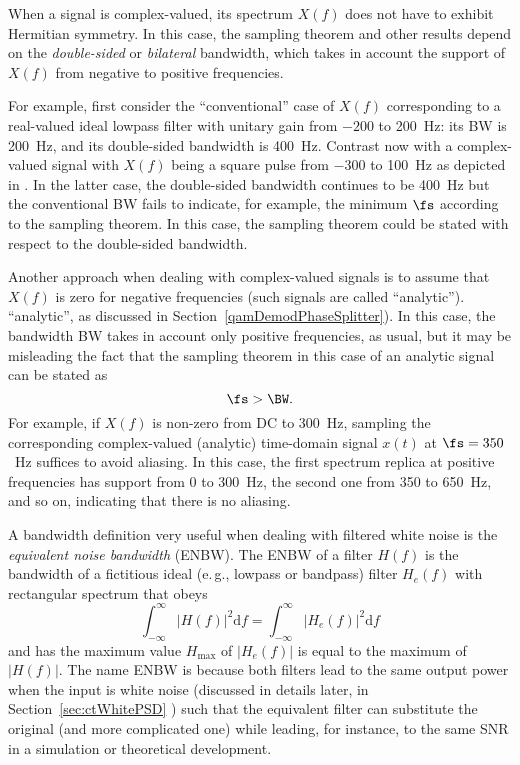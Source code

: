 When a signal is complex-valued, its spectrum $X(f)$ does not have to exhibit Hermitian symmetry.
In this case, the sampling theorem and other results depend on the \emph{double-sided} or \emph{bilateral} bandwidth, which takes in account the support of $X(f)$ from negative to positive frequencies. 

For example, first consider the ``conventional'' case of $X(f)$ corresponding to a real-valued ideal lowpass filter with unitary gain from $-200$ to 200~Hz: its BW is 200~Hz, and its double-sided bandwidth is 400~Hz. Contrast now with a complex-valued signal with $X(f)$ being a square pulse from $-300$ to 100~Hz as depicted in . In the latter case, the double-sided bandwidth continues to be 400~Hz but the conventional BW fails to indicate, for example, the minimum $\fs$ according to the sampling theorem. In this case, the sampling theorem could be stated with
respect to the double-sided bandwidth.

Another approach when dealing  with complex-valued signals is to assume that $X(f)$ is zero for negative frequencies (such
signals are called
\ifml
``analytic'').
\else
``analytic'', as discussed in Section~\ref{qamDemodPhaseSplitter}). 
\fi
In this case, the bandwidth BW takes in account only positive
frequencies, as usual, but it may be misleading the fact that the sampling theorem 
in this case of an analytic signal can be stated as
\begin{equation}
\fs > \BW.
\label{eq:samplingTheoremComplexSignals}
\end{equation}
For example, if $X(f)$ is non-zero from DC to 300~Hz, sampling the corresponding complex-valued
(analytic) time-domain signal $x(t)$ at $\fs = 350$~Hz suffices to avoid aliasing. In this case,
the first spectrum replica at positive frequencies has support from 0 to 300~Hz, the second one
from 350 to 650~Hz, and so on, indicating that there is no aliasing.

A bandwidth definition very useful when dealing with filtered white noise is the \emph{equivalent noise bandwidth} (ENBW). The ENBW of a filter $H(f)$ is the bandwidth of a fictitious ideal (e.\,g., lowpass or bandpass) filter $H_e(f)$ with rectangular spectrum that obeys
\begin{equation}
\int_{-\infty}^{\infty} |H(f)|^2 \textrm{d}f = \int_{-\infty}^{\infty} |H_e(f)|^2 \textrm{d}f
\label{eq:enbwProperty}
\end{equation}
and has the maximum value $H_{\textrm{max}}$ of $|H_e(f)|$ is equal to the maximum of $|H(f)|$.
The name ENBW is because both filters lead to the same output power when the input is white noise (discussed in details later, in Section~\ref{sec:ctWhitePSD}
) such that the equivalent filter can substitute the original (and more complicated one) while leading, for instance, to the same SNR in a simulation or theoretical development.

